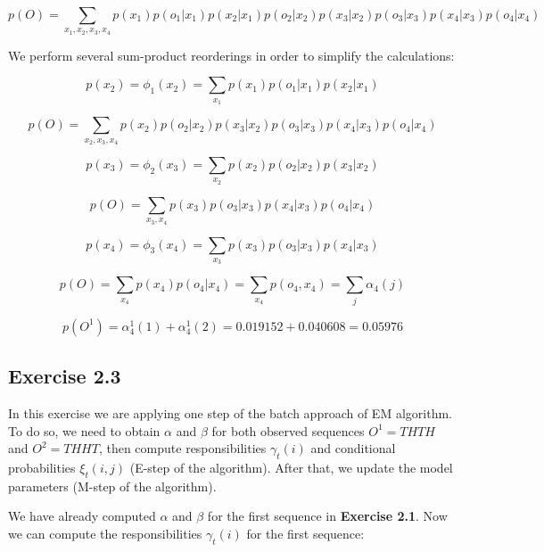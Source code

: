 \documentclass[11pt,a4paper]{article}
\begin{document}
	$$ p(O) = \sum_{x_1, x_2, x_3, x_4} p(x_1) p(o_1 | x_1) p(x_2 | x_1) p(o_2 |x_2) p(x_3 |x_2) p(o_3|x_3) p(x_4 |x_3) p(o_4 | x_4) $$
	
	We perform several sum-product reorderings in order to simplify the calculations:
	
	$$ p(x_2) = \phi_1(x_2) = \sum_{x_1} p(x_1) p(o_1 |x_1) p(x_2 | x_1) $$
	
	$$ p(O) = \sum_{x_2, x_3, x_4}p(x_2) p(o_2 |x_2) p(x_3 |x_2) p(o_3|x_3) p(x_4 |x_3) p(o_4 | x_4) $$
	
	$$ p(x_3) = \phi_2(x_3) = \sum_{x_2} p(x_2) p(o_2 |x_2) p(x_3 | x_2) $$
	
	$$ p(O) = \sum_{x_3, x_4} p(x_3) p(o_3|x_3) p(x_4 |x_3) p(o_4 | x_4) $$
	
	$$ p(x_4) = \phi_3(x_4) = \sum_{x_3} p(x_3) p(o_3 |x_3) p(x_4 | x_3) $$
	
	$$ p(O) = \sum_{x_4} p(x_4) p(o_4 | x_4) =  \sum_{x_4} p(o_4, x_4) = \sum_{j} \alpha_4(j)$$ 
	
	$$ p(O^1) = \alpha_4^1(1) + \alpha_4^1(2) = 0.019152 + 0.040608 = 0.05976 $$
	
	
	\subsection*{Exercise 2.3}
	
	In this exercise we are applying one step of the batch approach of EM algorithm. To do so, we need to obtain $\alpha$ and $\beta$ for both observed sequences $O^1 = THTH$ and $O^2 = THHT$, then compute responsibilities $\gamma_t(i)$ and conditional probabilities $\xi_t(i, j)$ (E-step of the algorithm). After that, we update the model parameters (M-step of the algorithm).
	
	We have already computed $\alpha$ and $\beta$ for the first sequence in \textbf{Exercise 2.1}. 
	Now we can compute the responsibilities	$\gamma_t(i)$ for the first sequence:
		
\end{document}
